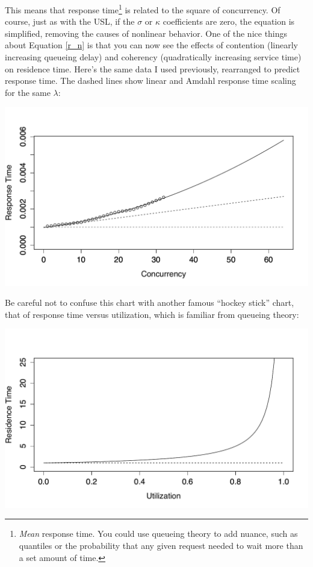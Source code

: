 \documentclass{vivid_layout}
\begin{document}
This means that response time\footnote{{\itshape Mean} response time. You could
use queueing theory to add nuance, such as quantiles or the probability that any given
request needed to wait more than a set amount of time.} is related to the square
of concurrency.  Of course, just as with the USL, if the $\sigma$ or $\kappa$
coefficients are zero, the equation is simplified, removing the causes of
nonlinear behavior. One of the nice things about Equation \ref{r_n} is that you
can now see the effects of contention (linearly increasing queueing delay) and
coherency (quadratically increasing service time) on residence time.  Here's the
same data I used previously, rearranged to predict response time. The
dashed lines show linear and Amdahl response time scaling for the same
$\lambda$:
\begin{center}
\includegraphics[width=.85\linewidth]{scalability/cisco-tput}
\end{center}

Be careful not to confuse this chart with another famous ``hockey stick'' chart,
that of response time versus utilization, which is familiar from queueing
theory:
\begin{center}
\includegraphics[width=.85\linewidth]{scalability/hockey}
\end{center}
\end{document}
